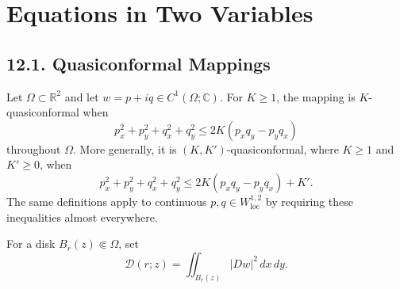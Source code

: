 \chapter{Equations in Two Variables}

\section*{12.1. Quasiconformal Mappings}

\begin{definition}
\label{gt-ch12-def-quasiconformal-mapping}
Let $\Omega\subset\mathbb R^2$ and let
$w=p+iq\in C^1(\Omega;\mathbb C)$.  For $K\ge1$, the mapping is
$K$-quasiconformal when
\begin{equation}\tag{12.1}
p_x^2+p_y^2+q_x^2+q_y^2
\le2K(p_xq_y-p_yq_x)
\end{equation}
throughout $\Omega$.  More generally, it is $(K,K')$-quasiconformal, where
$K\ge1$ and $K'\ge0$, when
\begin{equation}\tag{12.2}
p_x^2+p_y^2+q_x^2+q_y^2
\le2K(p_xq_y-p_yq_x)+K'.
\end{equation}
The same definitions apply to continuous $p,q\in W^{1,2}_{\mathrm{loc}}$ by
requiring these inequalities almost everywhere.
\end{definition}

For a disk $B_r(z)\Subset\Omega$, set
\begin{equation}\tag{12.3}
\mathcal D(r;z)=\iint_{B_r(z)}|Dw|^2\,dx\,dy.
\end{equation}

